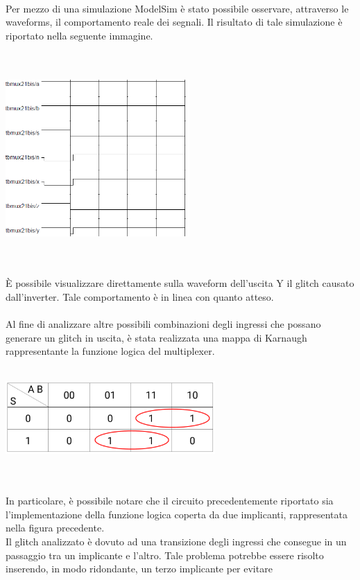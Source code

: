 \documentclass[11pt,  english, makeidx, a4paper, titlepage, oneside]{book}
\begin{document}
\\\\\\
Per mezzo di una simulazione ModelSim è stato possibile osservare,
attraverso le waveforms, il comportamento reale dei segnali. Il risultato
di tale simulazione è riportato nella seguente immagine.\\
\\\\
\centerline{\includegraphics[width=7cm]{./img/Lab_1/Es_4/Glitch.png}}
\\\\
È possibile visualizzare direttamente sulla waveform dell'uscita Y
il glitch causato dall'inverter. Tale comportamento è in linea con 
quanto atteso.
\\\\
Al fine di analizzare altre possibili combinazioni degli ingressi
che possano generare un glitch in uscita, è stata realizzata una 
mappa di Karnaugh rappresentante la funzione logica del multiplexer.
\\\\
\centerline{\includegraphics[width=8cm]{./img/Lab_1/Es_4/Mappa_K_coperta.png}}
\\\\
In particolare, è possibile notare che il circuito precedentemente riportato sia l'implementazione della funzione logica coperta da due implicanti, rappresentata nella figura precedente.
\\
Il glitch analizzato è dovuto ad una transizione degli ingressi che consegue in un passaggio
tra un implicante e l'altro. Tale problema potrebbe essere risolto
inserendo, in modo ridondante, un terzo implicante per evitare
\end{document}
